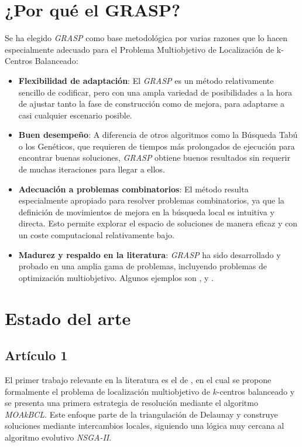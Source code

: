 \documentclass[12pt,a4paper]{book}
\begin{document}
\section{¿Por qué el GRASP?}
Se ha elegido \textit{GRASP} como base metodológica por varias razones que lo hacen especialmente adecuado para el Problema Multiobjetivo de Localización de k-Centros Balanceado:
\begin{itemize}
    \item \textbf{Flexibilidad de adaptación}: El \textit{GRASP} es un método relativamente sencillo de codificar, pero con una ampla variedad de posibilidades
    a la hora de ajustar tanto la fase de construcción como de mejora, para adaptarse a casi cualquier escenario posible. 
    \item \textbf{Buen desempeño}: A diferencia de otros algoritmos como la Búsqueda Tabú o los Genéticos, que requieren de tiempos más prolongados de ejecución para encontrar buenas soluciones,
    \textit{GRASP} obtiene buenos resultados sin requerir de muchas iteraciones para llegar a ellos.
    \item \textbf{Adecuación a problemas combinatorios}: El método resulta especialmente apropiado para resolver problemas combinatorios, ya que la definición de movimientos de mejora en la búsqueda local es intuitiva y directa.
    Esto permite explorar el espacio de soluciones de manera eficaz y con un coste computacional relativamente bajo.
    \item \textbf{Madurez y respaldo en la literatura}: \textit{GRASP} ha sido desarrollado y probado en una amplia gama de problemas, incluyendo problemas de optimización multiobjetivo. Algunos ejemplos son \cite{grasp_1}, \cite{grasp_3} y \cite{grasp_2}. 
\end{itemize}

\section{Estado del arte}

\subsection{Artículo 1}
El primer trabajo relevante en la literatura es el de \cite{k-balanced_1}, en el cual se propone formalmente el problema de localización multiobjetivo de $k$-centros balanceado y se presenta una primera estrategia de resolución mediante el algoritmo \textit{MOAkBCL}.
Este enfoque parte de la triangulación de Delaunay \citep{delaunay} y construye soluciones mediante intercambios locales, siguiendo una lógica muy cercana al algoritmo evolutivo \textit{NSGA-II}.
\end{document}
